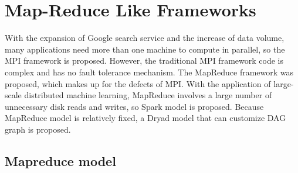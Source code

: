 \documentclass[journal]{IEEEtran}
\begin{document}
%



\section{Map-Reduce Like Frameworks}

With the expansion of Google search service and the increase of data volume, many applications need more than one machine to compute in parallel, so the MPI framework is proposed. However, the traditional MPI framework code is complex and has no fault tolerance mechanism. The MapReduce framework was proposed, which makes up for the defects of MPI. With the application of large-scale distributed machine learning, MapReduce involves a large number of unnecessary disk reads and writes, so Spark model is proposed. Because MapReduce model is relatively fixed, a Dryad model that can customize DAG graph is proposed.
\subsection{Mapreduce model}
\end{document}
